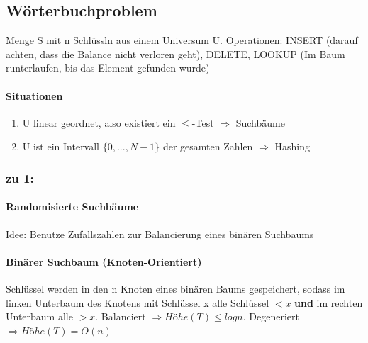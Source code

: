 
\subsection*{Wörterbuchproblem}
Menge S mit n Schlüssln aus einem Universum U.
Operationen: INSERT (darauf achten, dass die Balance nicht verloren geht), DELETE, LOOKUP (Im Baum runterlaufen, bis das Element gefunden wurde)
\paragraph{Situationen}
\begin{enumerate}
    \item U linear geordnet, also existiert ein $ \leq $-Test $ \Rightarrow $ Suchbäume
    \item U ist ein Intervall $ \{0,..., N-1\} $ der gesamten Zahlen $ \Rightarrow $ Hashing
\end{enumerate}
\subsubsection*{\underline{zu 1:}}

\paragraph{Randomisierte Suchbäume}
Idee: Benutze Zufallszahlen zur Balancierung eines binären Suchbaums

\paragraph{Binärer Suchbaum (Knoten-Orientiert)}
Schlüssel werden in den n Knoten eines binären Baums gespeichert, sodass im linken Unterbaum des Knotens mit Schlüssel x alle Schlüssel $ < x $ \textbf{und} im rechten Unterbaum alle $ > x $. Balanciert $ \Rightarrow Höhe(T)\leq logn$.  Degeneriert $ \Rightarrow Höhe(T) = O(n)$

